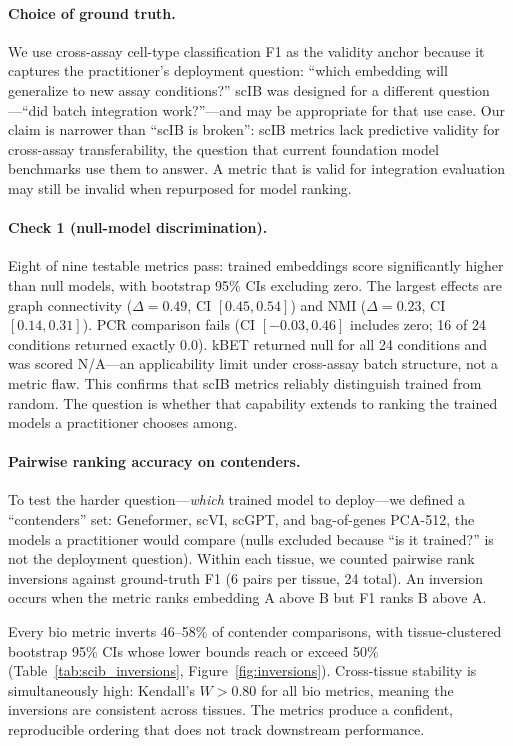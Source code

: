 \documentclass[10pt,letterpaper]{article}
\begin{document}
\paragraph{Choice of ground truth.} We use cross-assay cell-type classification F1 as the validity anchor because it captures the practitioner's deployment question: ``which embedding will generalize to new assay conditions?'' scIB was designed for a different question---``did batch integration work?''---and may be appropriate for that use case. Our claim is narrower than ``scIB is broken'': scIB metrics lack predictive validity for cross-assay transferability, the question that current foundation model benchmarks use them to answer. A metric that is valid for integration evaluation may still be invalid when repurposed for model ranking.

\paragraph{Check 1 (null-model discrimination).} Eight of nine testable metrics pass: trained embeddings score significantly higher than null models, with bootstrap 95\% CIs excluding zero. The largest effects are graph connectivity ($\Delta = 0.49$, CI $[0.45, 0.54]$) and NMI ($\Delta = 0.23$, CI $[0.14, 0.31]$). PCR comparison fails (CI $[-0.03, 0.46]$ includes zero; 16 of 24 conditions returned exactly 0.0). kBET returned null for all 24 conditions and was scored N/A---an applicability limit under cross-assay batch structure, not a metric flaw. This confirms that scIB metrics reliably distinguish trained from random. The question is whether that capability extends to ranking the trained models a practitioner chooses among.

\paragraph{Pairwise ranking accuracy on contenders.} To test the harder question---\emph{which} trained model to deploy---we defined a ``contenders'' set: Geneformer, scVI, scGPT, and bag-of-genes PCA-512, the models a practitioner would compare (nulls excluded because ``is it trained?'' is not the deployment question). Within each tissue, we counted pairwise rank inversions against ground-truth F1 (6 pairs per tissue, 24 total). An inversion occurs when the metric ranks embedding A above B but F1 ranks B above A.

Every bio metric inverts 46--58\% of contender comparisons, with tissue-clustered bootstrap 95\% CIs whose lower bounds reach or exceed 50\% (Table~\ref{tab:scib_inversions}, Figure~\ref{fig:inversions}). Cross-tissue stability is simultaneously high: Kendall's $W > 0.80$ for all bio metrics, meaning the inversions are consistent across tissues. The metrics produce a confident, reproducible ordering that does not track downstream performance.
\end{document}
